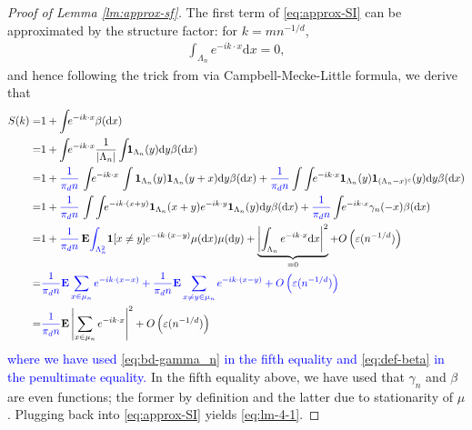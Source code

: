 \documentclass[12pt]{article}
\newcommand{\1}{\mathbf{1}}
\newcommand{\md}{\mathrm{d}}
\newcommand{\dy}[1]{\textcolor{blue}{#1}}
\newcommand{\dy}[1]{#1}%
\begin{document}
{{{{{\begin{proof}[Proof of Lemma  \ref{lm:approx-sf}]
The first term of  \eqref{eq:approx-SI} can be approximated by the structure factor: for $ k= mn^{-1/d}$,
\begin{align*}  {
\int_{\Lambda _{n}}e^{-ik \cdot x}\md x
}  = 0,
\end{align*}
and hence following the trick from \cite{hawat2023estimating} via Campbell-Mecke-Little formula, we derive that
\begin{align*}
S(k)   = &1 +\int_{}e^{-ik \cdot x}\beta (\md x)\\
  = &1 + \int_{}e^{-ik \cdot x}\frac{ 1}{ | \Lambda _{n} | }\int_{}\1_{\Lambda _{n}}(y)\md y\beta (\md x)\\
= &1 + \dy{\frac{1}{\pi_d n}} \, \int_{}e^{-ik \cdot x} \, \int{\1_{\Lambda _{n}}(y)}\1_{\Lambda _{n}}(y+x)\md y\beta (\md x)+ \dy{\frac{1}{\pi_d n}}\int \int_{}e^{-ik \cdot x}\1_{\Lambda _{n}}(y)\1_{(\Lambda _{n}-x)^{c}}(y)\md y\beta (\md x)\\
= &1 + \dy{\frac{1}{\pi_d n}} \,\int  \int_{}e^{-ik \cdot (x+y)}\1_{\Lambda _{n}}(x+y)e^{-ik \cdot y}\1_{\Lambda _{n}}(y)\md y\beta (\md x)+
\dy{\frac{1}{\pi_d n}}\int_{}e^{-ik \cdot x}\gamma _{n}(-x)\beta (\md x)
\\
= &1 + \dy{\frac{1}{\pi_d n}} \, \mathbf{E}\dy{\int_{\Lambda_n^2}}\1[x\neq y]e^{-ik \cdot (x - y)}\mu (\md x)\mu (\md y) +\underbrace{\left | {
\int_{\Lambda _{n}}e^{-ik \cdot x}\md x
} \right | ^{2}}_{ = 0}+O\left(
\varepsilon (n^{-1/d})
\right)\\
= &  \dy{\frac{1}{\pi_d n}\mathbf{E}
\sum_{x {\in \mu_n}}e^{-ik \cdot (x-x)} + \dy{\frac{1}{\pi_d n}}\mathbf{E}
\sum_{x \neq y {\in \mu_n}}e^{-ik \cdot (x-y)}
+O\left(
\varepsilon (n^{-1/d})
\right) } \\
= &  \dy{\frac{1}{\pi_d n}}\mathbf{E}
\left| \sum_{x {\in \mu_n}}e^{-ik \cdot x} \right|^2 
+O\left(
\varepsilon (n^{-1/d})
\right)
\end{align*}
%
\dy{where we have used \eqref{eq:bd-gamma_n} in the fifth equality and \eqref{eq:def-beta} in the penultimate equality.} {In the fifth equality above, we have used that $\gamma_n$ and $\beta$ are even functions; the former by definition and the latter due to stationarity of $\mu$.}
Plugging back into  \eqref{eq:approx-SI} yields   \eqref{eq:lm-4-1}.


\end{proof}}}}}}
\end{document}
